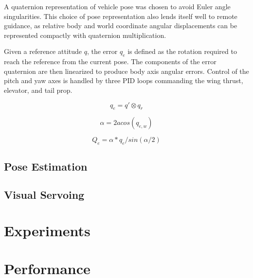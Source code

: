 \documentclass[letterpaper, 10 pt, conference]{ieeeconf}
\begin{document}
A quaternion representation of vehicle pose was chosen to avoid Euler angle singularities. This choice of pose representation also lends itself well to remote guidance, as relative body and world coordinate angular displacements can be represented compactly with quaternion multiplication. 

Given a reference attitude $q$, the error $q_e$ is defined as the rotation required to reach the reference from the current pose. The components of the error quaternion are then linearized to produce body axis angular errors. Control of the pitch and yaw axes is handled by three PID loops commanding the wing thrust, elevator, and tail prop.

\begin{equation}
\label{quat_error}
q_e = q'\otimes q_r
\end{equation}

\begin{equation}
\label{quat_angle}
\alpha = 2acos(q_{e,w})
\end{equation}

\begin{equation}
\label{quat_linearize}
Q_e = \alpha*q_e/sin(\alpha /2)
\end{equation}

\subsection{Pose Estimation}

\subsection{Visual Servoing}


\section{Experiments}


\section{Performance}
\end{document}
